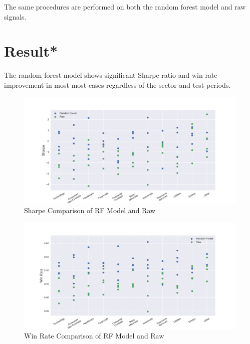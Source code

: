 \documentclass[12pt]{article}
\begin{document}
The same procedures are performed on both the random forest model and raw signals.


\section{Result*}

The random forest model shows significant Sharpe ratio and win rate improvement in most most cases regardless of the sector and test periods.

\begin{figure}[h]
  \begin{center}
    \includegraphics[width=1\linewidth]{figure/rf_raw_sharpe.png}
  \end{center}
  \caption{Sharpe Comparison of RF Model and Raw}
  \label{fig:rf_raw_sharpe}
\end{figure}

\begin{figure}[h]
  \begin{center}
    \includegraphics[width=1\linewidth]{figure/rf_raw_win_rate.png}
  \end{center}
  \caption{Win Rate Comparison of RF Model and Raw}
  \label{fig:rf_raw_win_rate}
\end{figure}
\end{document}
